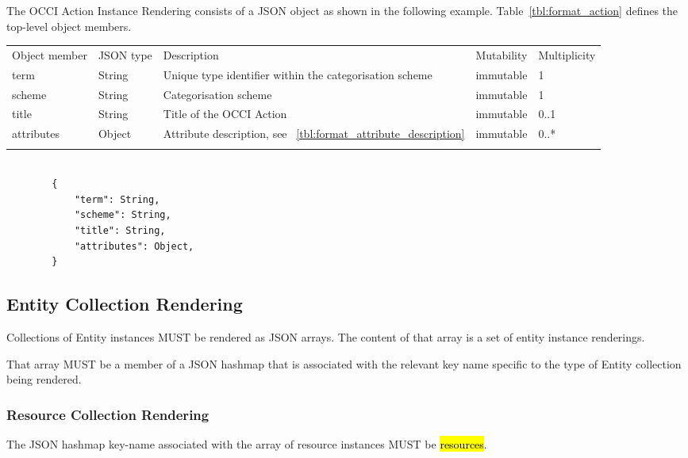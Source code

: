 \documentclass[10pt,a4paper]{article}
\begin{document}
The OCCI Action Instance Rendering consists of a JSON object as shown in the
following example.
Table~\ref{tbl:format_action} defines the top-level object members.

 {
    \begin{tabularx}{\textwidth}{llXll}
    \toprule
    Object member & JSON type & Description & Mutability & Multiplicity \\
    \colrule
    term & String & Unique type identifier within the categorisation scheme &
immutable & 1 \\

    scheme & String & Categorisation scheme & immutable & 1 \\

    title & String & Title of the OCCI Action & immutable & 0..1 \\

    attributes & Object & Attribute description, see
~\ref{tbl:format_attribute_description} & immutable & 0..* \\
    \botrule
    \end{tabularx}
}

\begin{lstlisting}

        {
            "term": String,
            "scheme": String,
            "title": String,
            "attributes": Object,
        }

\end{lstlisting}



\subsection{Entity Collection Rendering}
Collections of Entity instances MUST be rendered as JSON arrays. The content of that array is a set of entity instance renderings.

That array MUST be a member of a JSON hashmap that is associated with the relevant key name specific to the type of Entity collection being rendered.

\subsubsection{Resource Collection Rendering}

The JSON hashmap key-name associated with the array of resource instances MUST be \hl{resources}.
\end{document}

